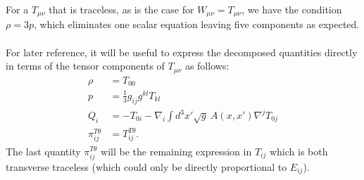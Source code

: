 \documentclass[10pt,letterpaper]{article}
\numberwithin{equation}{subsection}
\begin{document}
For a $T_{\mu\nu}$ that is traceless, as is the case for $W_{\mu\nu} = T_{\mu\nu}$, we have the condition $\rho = 3p$, which eliminates one scalar equation leaving five components as expected. 
\\ \\
For later reference, it will be useful to express the decomposed quantities directly in terms of the tensor components of $T_{\mu\nu}$ as follows:
\begin{align}
\rho &= T_{00}
\nonumber\\
p &= \frac{1}{3}g_{ij}g^{kl}T_{kl}
\nonumber \\
Q_i &= -T_{0i} - \nabla_i \int d^3x' \sqrt g\ A(x,x') \nabla^j T_{0j}
\nonumber\\
\pi_{ij}^{T\theta} &= T_{ij}^{T\theta}.
\end{align}
The last quantity $\pi_{ij}^{T\theta}$ will be the remaining expression in $T_{ij}$ which is both transverse traceless (which could only be directly proportional to $E_{ij}$). 
\end{document}
